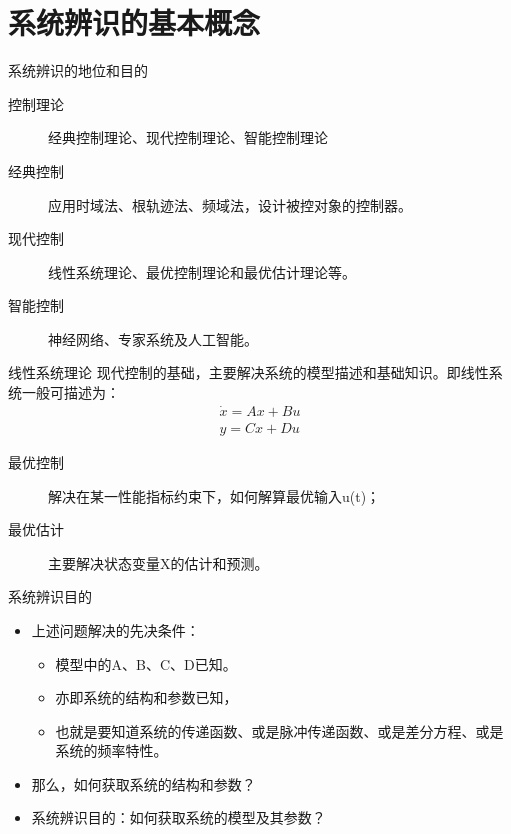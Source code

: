 \section{系统辨识的基本概念}
\begin{frame}{系统辨识的地位和目的}
\begin{description}
\item[控制理论]经典控制理论、现代控制理论、智能控制理论
\item[经典控制]应用时域法、根轨迹法、频域法，设计被控对象的控制器。
\item[现代控制]线性系统理论、最优控制理论和最优估计理论等。
\item[智能控制]神经网络、专家系统及人工智能。
\end{description}
\end{frame}

\begin{frame}{线性系统理论}
现代控制的基础，主要解决系统的模型描述和基础知识。即线性系统一般可描述为：
\begin{eqnarray}
\dot x = Ax+Bu \\
y=Cx+Du
\end{eqnarray}
\begin{description}
\item[最优控制] 解决在某一性能指标约束下，如何解算最优输入u(t)；
\item[最优估计] 主要解决状态变量X的估计和预测。
\end{description}
\end{frame}


\begin{frame}{系统辨识目的}
\begin{itemize}
\item 上述问题解决的先决条件：
\begin{itemize}
\item 模型中的A、B、C、D已知。
\item 亦即系统的结构和参数已知，
\item 也就是要知道系统的传递函数、或是脉冲传递函数、或是差分方程、或是系统的频率特性。
\end{itemize}
\item 那么，如何获取系统的结构和参数？
\item 系统辨识目的：如何获取系统的模型及其参数？
\end{itemize}
\end{frame}


